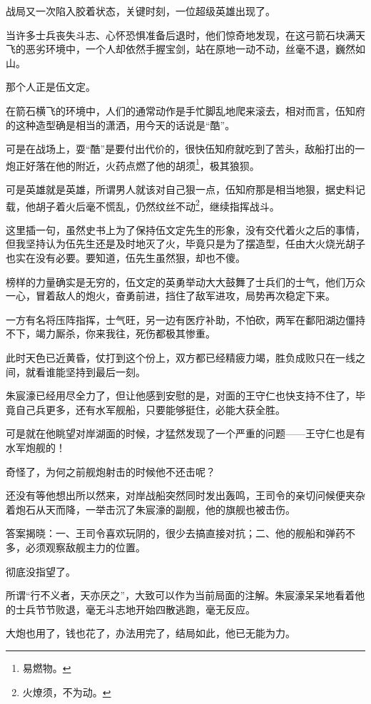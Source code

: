 \begin{multicols}{\theparacolNo}
战局又一次陷入胶着状态，关键时刻，一位超级英雄出现了。

当许多士兵丧失斗志、心怀恐惧准备后退时，他们惊奇地发现，在这弓箭石块满天飞的恶劣环境中，一个人却依然手握宝剑，站在原地一动不动，丝毫不退，巍然如山。

那个人正是伍文定。

在箭石横飞的环境中，人们的通常动作是手忙脚乱地爬来滚去，相对而言，伍知府的这种造型确是相当的潇洒，用今天的话说是“酷”。

可是在战场上，耍“酷”是要付出代价的，很快伍知府就吃到了苦头，敌船打出的一炮正好落在他的附近，火药点燃了他的胡须\footnote{易燃物。}，极其狼狈。

可是英雄就是英雄，所谓男人就该对自己狠一点，伍知府那是相当地狠，据史料记载，他胡子着火后毫不慌乱，仍然纹丝不动\footnote{火燎须，不为动。}，继续指挥战斗。

这里插一句，虽然史书上为了保持伍文定先生的形象，没有交代着火之后的事情，但我坚持认为伍先生还是及时地灭了火，毕竟只是为了摆造型，任由大火烧光胡子也实在没有必要。要知道，伍先生虽然狠，却也不傻。

榜样的力量确实是无穷的，伍文定的英勇举动大大鼓舞了士兵们的士气，他们万众一心，冒着敌人的炮火，奋勇前进，挡住了敌军进攻，局势再次稳定下来。

一方有名将压阵指挥，士气旺，另一边有医疗补助，不怕砍，两军在鄱阳湖边僵持不下，竭力厮杀，你来我往，死伤都极其惨重。

此时天色已近黄昏，仗打到这个份上，双方都已经精疲力竭，胜负成败只在一线之间，就看谁能坚持到最后一刻。

朱宸濠已经用尽全力了，但让他感到安慰的是，对面的王守仁也快支持不住了，毕竟自己兵更多，还有水军舰船，只要能够挺住，必能大获全胜。

可是就在他眺望对岸湖面的时候，才猛然发现了一个严重的问题——王守仁也是有水军炮舰的！

奇怪了，为何之前舰炮射击的时候他不还击呢？

还没有等他想出所以然来，对岸战船突然同时发出轰鸣，王司令的亲切问候便夹杂着炮石从天而降，一举击沉了朱宸濠的副舰，他的旗舰也被击伤。

答案揭晓：一、王司令喜欢玩阴的，很少去搞直接对抗；二、他的舰船和弹药不多，必须观察敌舰主力的位置。

彻底没指望了。

所谓“行不义者，天亦厌之”，大致可以作为当前局面的注解。朱宸濠呆呆地看着他的士兵节节败退，毫无斗志地开始四散逃跑，毫无反应。

大炮也用了，钱也花了，办法用完了，结局如此，他已无能为力。


\end{multicols}
